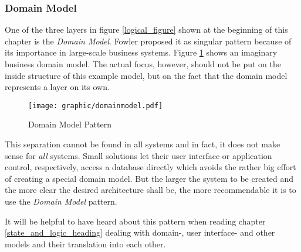 %
%
%
%
%
%
%

\subsubsection{Domain Model}
\label{domain_model_heading}

One of the three layers in figure \ref{logical_figure} shown at the beginning
of this chapter is the \emph{Domain Model}. Fowler \cite{fowler2002} proposed
it as singular pattern because of its importance in large-scale business
systems. Figure \ref{domainmodel_figure} shows an imaginary business domain
model. The actual focus, however, should not be put on the inside structure of
this example model, but on the fact that the domain model represents a layer on
its own.

\begin{figure}[ht]
    \begin{center}
        \texttt{[image: graphic/domainmodel.pdf]}
        \caption{Domain Model Pattern}
        \label{domainmodel_figure}
    \end{center}
\end{figure}

This separation cannot be found in all systems and in fact, it does not make
sense for \emph{all} systems. Small solutions let their user interface or
application control, respectively, access a database directly which avoids the
rather big effort of creating a special domain model. But the larger the system
to be created and the more clear the desired architecture shall be, the more
recommendable it is to use the \emph{Domain Model} pattern.

It will be helpful to have heard about this pattern when reading chapter
\ref{state_and_logic_heading} dealing with domain-, user interface- and other
models and their translation into each other.
